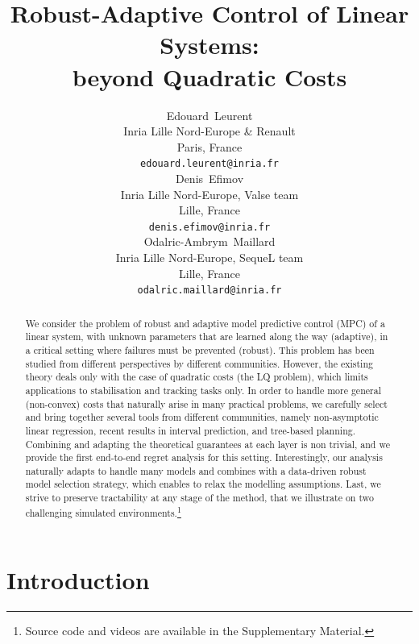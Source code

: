 \documentclass{article}
\title{Robust-Adaptive Control of Linear Systems:\\ beyond Quadratic Costs}
\author{%
	Edouard~Leurent \\
	Inria Lille Nord-Europe \& Renault\\
	Paris, France\\
	\texttt{edouard.leurent@inria.fr} \\
	 \And
	 Denis~Efimov \\
	 Inria Lille Nord-Europe, Valse team\\
	 Lille, France\\
	 \texttt{denis.efimov@inria.fr} \\
	 \And
	 Odalric-Ambrym~Maillard \\
	 Inria Lille Nord-Europe, SequeL team\\
	 Lille, France\\
	 \texttt{odalric.maillard@inria.fr} \\
}
\begin{document}
	
\maketitle

\begin{abstract}
We consider the problem of robust and adaptive model predictive control (MPC) of a linear system, with unknown parameters that are learned along the way (adaptive), in a critical setting where failures must be prevented (robust). This problem has been studied from different perspectives by different communities. However, the existing theory deals only with the case of quadratic costs (the LQ problem), which limits applications to stabilisation and tracking tasks only. In order to handle more general (non-convex) costs that naturally arise in many practical problems, we carefully select and bring together several tools from different communities, namely non-asymptotic linear regression, recent results in interval prediction, and tree-based planning. Combining and adapting the theoretical guarantees at each layer is non trivial, and we provide the first end-to-end regret analysis for this setting. Interestingly, our analysis naturally adapts to handle many models and combines with a data-driven robust model selection strategy, which enables to relax the modelling assumptions. Last, we strive to preserve tractability at any stage of the method, that we illustrate on two challenging simulated environments.\footnote{Source code and videos are available in the Supplementary Material.}
\end{abstract}	




\section{Introduction}
\end{document}

